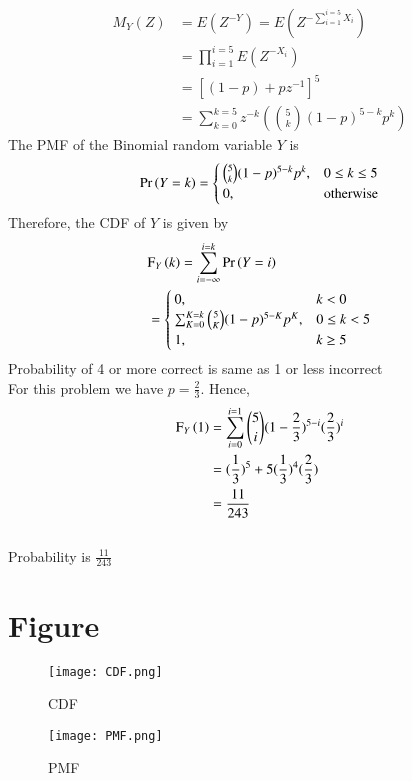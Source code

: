 \documentclass[journal,12pt,twocolumn]{IEEEtran}
\begin{document}
\begin{align}
M_Y(Z) &= E(Z^{-Y}) = E(Z^{-\sum_{i = 1}^{i = 5}X_i}) \\
&= \prod_{i = 1}^{i = 5}E(Z^{-X_i}) \\
&= [(1 - p) + pz^{-1}]^5 \\
&= \sum_{k = 0}^{k = 5}z^{-k}(\binom{5}{k}(1 - p)^{5 - k}p^k)
\end{align}
The PMF of the Binomial random variable $Y$ is
\begin{align}
\Pr\left(Y = k\right) = 
\begin{cases}
\binom{5}{k}(1 - p)^{5 - k}p^k, & 0 \leq k \leq 5 \\
0, & \textrm{otherwise}
\end{cases}
\end{align}
Therefore, the CDF of $Y$ is given by
\begin{align}
&\text{F}_{Y}\left(k\right) = \sum_{i = -\infty}^{i = k}\Pr\left(Y = i\right) \nonumber\\
&=\begin{cases}
0, & k < 0 \\
\sum_{K = 0}^{K = k}\binom{5}{K}(1 - p)^{5 - K}p^K, & 0 \leq k < 5 \\
1, & k \geq 5
\end{cases}
\end{align}
Probability of 4 or more correct is same as 1 or less incorrect\\
For this problem we have $p = \frac{2}{3}$. Hence, 
\begin{align}
\text{F}_{Y}\left(1\right) &= \sum_{i = 0}^{i = 1}\binom{5}{i}(1 - \frac{2}{3})^{5 - i}(\frac{2}{3})^i \\
&= (\frac{1}{3})^{5} + 5(\frac{1}{3})^4(\frac{2}{3})\\
&= \frac{11}{243}
\end{align} 
\\ 
Probability is $\frac{11}{243}$
\section*{Figure}

\begin{figure}[h]
\centering
\texttt{[image: CDF.png]}
\caption{CDF}
\label{Fig1}
\end{figure}

\begin{figure}[h]
\centering
\texttt{[image: PMF.png]}
\caption{PMF}
\label{Fig2}
\end{figure}
\end{document}
